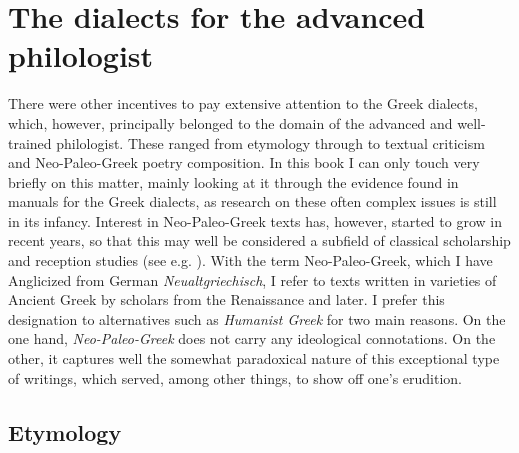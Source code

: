 \section{The dialects for the advanced philologist}\label{sec:3.2}

There were other incentives to pay extensive attention to the Greek dialects, which, however, principally belonged to the domain of the advanced and well-trained philologist. These ranged from etymology through to textual criticism and Neo-Paleo-Greek poetry composition. In this book I can only touch very briefly on this matter, mainly looking at it through the evidence found in manuals for the Greek dialects, as research on these often complex issues is still in its infancy. Interest in Neo-Paleo-Greek texts has, however, started to grow in recent years, so that this may well be considered a subfield of classical scholarship and reception studies (see e.g. \citealt{Pall2018}). With the term Neo-Paleo-Greek, which I have Anglicized from German \textit{Neualtgriechisch}, I refer to texts written in varieties of Ancient Greek by scholars from the Renaissance and later. I prefer this designation to alternatives such as \textit{Humanist Greek} for two main reasons. On the one hand, \textit{Neo-Paleo-Greek} does not carry any ideological connotations. On the other, it captures well the somewhat paradoxical nature of this exceptional type of writings, which served, among other things, to show off one’s erudition.

\subsection{Etymology}

